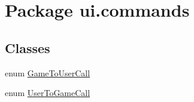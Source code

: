 \hypertarget{namespaceui_1_1commands}{}\section{Package ui.\+commands}
\label{namespaceui_1_1commands}
\subsection*{Classes}
\begin{DoxyCompactItemize}
\item 
enum \mbox{\hyperlink{enumui_1_1commands_1_1_game_to_user_call}{Game\+To\+User\+Call}}
\item 
enum \mbox{\hyperlink{enumui_1_1commands_1_1_user_to_game_call}{User\+To\+Game\+Call}}
\end{DoxyCompactItemize}
